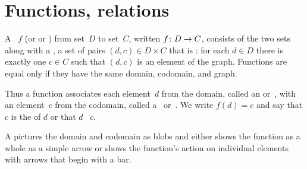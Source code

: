 \documentclass{ibl}
\begin{document}
\chapter{Functions, relations}
\begin{df}
A ~$f$ (or  or ) 
from  set~$D$
to  set~$C$, written $\mbox{$f\colon D\to C$}$,
consists of the two sets along with a , 
a set of pairs $(d,c)\in D\times C$ that is 
: for each $d\in D$ there is
exactly one $c\in C$ such that $(d,c)$ is an element of the graph. 
Functions are equal only if they have the same domain, codomain,
and graph.
\end{df}

\noindent Thus a function associates each element~$d$ from the domain,
called an  or~,
with an element~$c$ from the codomain, 
called a~ or~. 
We write $f(d)=c$ and say that $c$ is the  of $d$ 
or that $d$ ~$c$.

A  pictures the domain and 
codomain as blobs and 
either shows the function as a whole as a simple arrow   
or shows the function's action on individual elements 
with arrows that begin with a bar.
\begin{center}
  \hspace{8em}
\end{center}
\end{document}
